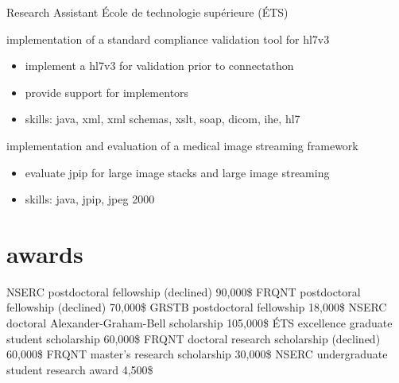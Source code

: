 \documentclass[print]{friggeri-cv}
\begin{document}
\begin{entrylist}
  {Research Assistant}
  {École de technologie supérieure {\scriptsize (ÉTS)}}
  {implementation of a standard compliance validation tool for hl{\small7}v{\small3}
  \begin{itemize}
    \item implement a hl{\small7}v{\small3} for validation prior to connectathon
    \item provide support for implementors
  \item skills: java, xml, xml schemas, xslt, soap, dicom, ihe, hl7
  \end{itemize}
  implementation and evaluation of a medical image streaming framework
  \begin{itemize}
    \item evaluate jpip for large image stacks and large image streaming
    \item skills: java, jpip, jpeg 2000
  \end{itemize}
  }
\end{entrylist}

\section{awards}
\begin{entrylist}
   {{\small NSERC} postdoctoral fellowship (declined)} {90,000\$} {\vspace{-3mm}}
   {{\small FRQNT} postdoctoral fellowship (declined)} {70,000\$} {\vspace{-3mm}}
   {{\small GRSTB} postdoctoral fellowship} {18,000\$} {\vspace{-3mm}}
   {{\small NSERC} doctoral Alexander-Graham-Bell scholarship} {105,000\$} {\vspace{-3mm}}
   {{\small ÉTS} excellence graduate student scholarship} {60,000\$} {\vspace{-3mm}}
   {{\small FRQNT} doctoral research scholarship (declined)} {60,000\$} {\vspace{-3mm}}
   {{\small FRQNT} master's research scholarship} {30,000\$} {\vspace{-3mm}}
   {{\small NSERC} undergraduate student research award} {4,500\$} {\vspace{-3mm}}
 \end{entrylist}
\vspace{2mm}

\end{document}
